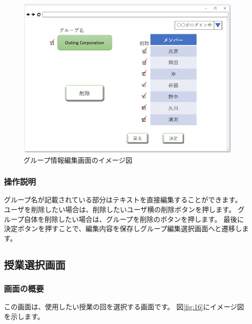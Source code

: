 \begin{figure}[htbp]
\begin{center}
  \includegraphics[width=1\linewidth,clip]{./img/15.png}
  \caption{グループ情報編集画面のイメージ図}\label{fig:15}
\end{center}
\end{figure}

\subsubsection{操作説明}
グループ名が記載されている部分はテキストを直接編集することができます。
ユーザを削除したい場合は、削除したいユーザ横の削除ボタンを押します。
グループ自体を削除したい場合は、グループを削除のボタンを押します。
最後に決定ボタンを押すことで、編集内容を保存しグループ編集選択画面へと遷移します。

\newpage

\subsection{授業選択画面}
\subsubsection{画面の概要}
この画面は、使用したい授業の回を選択する画面です。
図\ref{fig:16}にイメージ図を示します。

